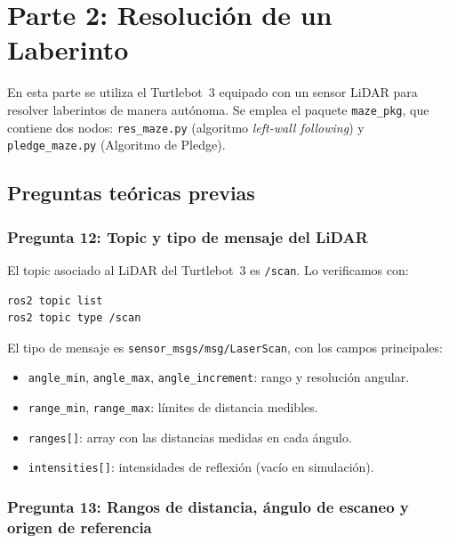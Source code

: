 \chapter{Parte 2: Resolución de un Laberinto}

En esta parte se utiliza el Turtlebot~3 equipado con un sensor LiDAR para resolver
laberintos de manera autónoma. Se emplea el paquete \texttt{maze\_pkg}, que contiene
dos nodos: \texttt{res\_maze.py} (algoritmo \textit{left-wall following}) y
\texttt{pledge\_maze.py} (Algoritmo de Pledge).

\section{Preguntas teóricas previas}

\subsection*{Pregunta 12: Topic y tipo de mensaje del LiDAR}

El topic asociado al LiDAR del Turtlebot~3 es \texttt{/scan}. Lo verificamos con:

\begin{lstlisting}[style=bash]
ros2 topic list
ros2 topic type /scan
\end{lstlisting}

El tipo de mensaje es \texttt{sensor\_msgs/msg/LaserScan}, con los campos principales:

\begin{itemize}
  \item \texttt{angle\_min}, \texttt{angle\_max}, \texttt{angle\_increment}: rango y resolución angular.
  \item \texttt{range\_min}, \texttt{range\_max}: límites de distancia medibles.
  \item \texttt{ranges[]}: array con las distancias medidas en cada ángulo.
  \item \texttt{intensities[]}: intensidades de reflexión (vacío en simulación).
\end{itemize}

\subsection*{Pregunta 13: Rangos de distancia, ángulo de escaneo y origen de referencia}


